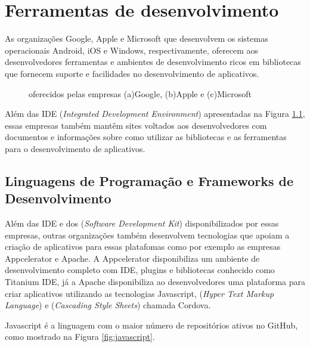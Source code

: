 \chapter{Ferramentas de desenvolvimento}\label{cha:ferramentas}
As organizações Google, Apple e Microsoft que desenvolvem os sistemas operacionais Android, iOS e Windows, respectivamente, oferecem aos desenvolvedores ferramentas e ambientes de desenvolvimento ricos em bibliotecas que fornecem suporte e facilidades no desenvolvimento de aplicativos.

\begin{figure}[h]
	\center
	\qquad
	\qquad
	\caption[IDE oferecidos pelas empresas]{ oferecidos pelas empresas (a)Google, (b)Apple e (c)Microsoft}
	\label{fig:IDES}
\end{figure}
\vspace{-3mm}

Além das IDE (\textit{Integrated Development Environment}) apresentadas na Figura \ref{fig:IDES}, essas empresas também mantêm sites voltados aos desenvolvedores com documentos e informações sobre como utilizar as bibliotecas e as ferramentas para o desenvolvimento de aplicativos.

\section{Linguagens de Programação e Frameworks de Desenvolvimento}
Além das IDE e dos  (\textit{Software Development Kit}) disponibilizados por essas empresas, outras organizações também desenvolvem tecnologias que apoiam a criação de aplicativos para essas platafomas como por exemplo as empresas Appcelerator e Apache. A Appcelerator disponibiliza um ambiente de desenvolvimento completo com IDE, plugins e bibliotecas conhecido como Titanium IDE, já a Apache disponibiliza ao desenvolvedores uma plataforma para criar aplicativos utilizando as tecnologias Javascript,  (\textit{Hyper Text Markup Language}) e  (\textit{Cascading Style Sheets}) chamada Cordova.

Javascript é a linguagem com o maior número de repositórios ativos no GitHub, como mostrado na Figura \ref{fig:javascript}.

